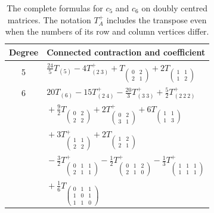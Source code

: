 \documentclass[11pt]{article}
\theoremstyle{definition}
\theoremstyle{remark}
\begin{document}
\begin{table}[!htbp]
\centering\small
\begin{tabular}{@{}cl@{}}
\toprule
Degree&Connected contraction and coefficient\\\midrule
5&$\displaystyle \frac{24}{5}T_{(5)}-4T_{(2\ 3)}^+
 +T_{\left(\begin{smallmatrix}0&2\\2&1\end{smallmatrix}\right)}
 +2T_{\left(\begin{smallmatrix}1&1\\1&2\end{smallmatrix}\right)}$\\[10pt]
6&$\displaystyle 20T_{(6)}-15T_{(2\ 4)}^+-\frac{20}{3}T_{(3\ 3)}^+
 +\frac52T_{(2\ 2\ 2)}^+$\\[8pt]
&$\displaystyle {}+\frac92T_{\left(\begin{smallmatrix}0&2\\2&2\end{smallmatrix}\right)}
 +2T_{\left(\begin{smallmatrix}0&2\\3&1\end{smallmatrix}\right)}^+
 +6T_{\left(\begin{smallmatrix}1&1\\1&3\end{smallmatrix}\right)}$\\[8pt]
&$\displaystyle {}+3T_{\left(\begin{smallmatrix}1&1\\2&2\end{smallmatrix}\right)}^+
 +2T_{\left(\begin{smallmatrix}1&2\\2&1\end{smallmatrix}\right)}$\\[8pt]
&$\displaystyle {}-\frac32T_{\left(\begin{smallmatrix}0&1&1\\2&1&1\end{smallmatrix}\right)}^+
 -\frac12T_{\left(\begin{smallmatrix}0&1&2\\2&1&0\end{smallmatrix}\right)}^+
 -\frac13T_{\left(\begin{smallmatrix}1&1&1\\1&1&1\end{smallmatrix}\right)}^+$\\[8pt]
&$\displaystyle {}+\frac16T_{\left(\begin{smallmatrix}0&1&1\\1&0&1\\1&1&0\end{smallmatrix}\right)}$\\
\bottomrule
\end{tabular}
\caption{The complete formulas for $c_5$ and $c_6$ on doubly centred matrices. The notation $T_A^+$ includes the transpose even when the numbers of its row and column vertices differ.}\label{tab:cumulants}
\end{table}
\end{document}
